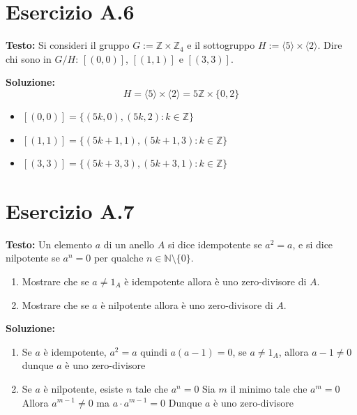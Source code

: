 \documentclass[a4paper,12pt]{article}
\newcommand{\esercizio}[2]{%
    \textbf{Testo:}
    #1
    
    \vspace{1.5em}
    
    \textbf{Soluzione:}
    #2
}
\begin{document}
\section*{Esercizio A.6}
\esercizio{%
    Si consideri il gruppo $G := \mathbb{Z} \times \mathbb{Z}_4$ e il sottogruppo $H := \langle5\rangle \times \langle2\rangle$. Dire chi sono in $G/H$: $[(0,0)]$, $[(1,1)]$ e $[(3,3)]$.
}{%
    \[
        H = \langle5\rangle \times \langle2\rangle = 5\mathbb{Z} \times \{0,2\}
    \]
    \begin{itemize}
        \item $[(0,0)] = \{(5k,0),(5k,2): k \in \mathbb{Z}\}$
        \item $[(1,1)] = \{(5k+1,1),(5k+1,3): k \in \mathbb{Z}\}$
        \item $[(3,3)] = \{(5k+3,3),(5k+3,1): k \in \mathbb{Z}\}$
    \end{itemize}
}

\section*{Esercizio A.7}
\esercizio{%
    Un elemento $a$ di un anello $A$ si dice idempotente se $a^2 = a$, e si dice nilpotente se $a^n = 0$ per qualche $n \in \mathbb{N}\setminus\{0\}$.
    \begin{enumerate}
        \item Mostrare che se $a \neq 1_A$ è idempotente allora è uno zero-divisore di $A$.
        \item Mostrare che se $a$ è nilpotente allora è uno zero-divisore di $A$.
    \end{enumerate}
}{%
    \begin{enumerate}
        \item Se $a$ è idempotente, $a^2 = a$ quindi $a(a-1) = 0$, se $a \neq 1_A$, allora $a-1 \neq 0$ dunque $a$ è uno zero-divisore
        \item Se $a$ è nilpotente, esiste $n$ tale che $a^n = 0$
              Sia $m$ il minimo tale che $a^m = 0$
              Allora $a^{m-1} \neq 0$ ma $a \cdot a^{m-1} = 0$
              Dunque $a$ è uno zero-divisore
    \end{enumerate}
}
\end{document}

